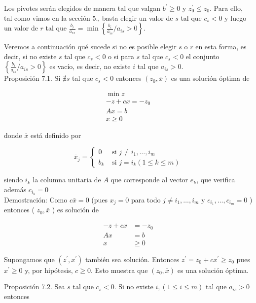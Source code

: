 \documentclass[10pt]{article}
\begin{document}
Los pivotes serán elegidos de manera tal que valgan $b^{\prime} \geq 0$ y $z_{0}^{\prime} \leq z_{0}$. Para ello, tal como vimos en la sección 5., basta elegir un valor de $s$ tal que $c_{s}<0$ y luego un valor de $r$ tal que $\frac{b_{r}}{a_{r s}}=\min \left\{\frac{b_{i}}{a_{i s}} / a_{i s}>0\right\}$.

Veremos a continuación qué sucede si no es posible elegir $s$ o $r$ en esta forma, es decir, si no existe $s$ tal que $c_{s}<0$ o si para $s$ tal que $c_{s}<0$ el conjunto $\left\{\frac{b_{i}}{a_{i s}} / a_{i s}>0\right\}$ es vacío, es decir, no existe $i$ tal que $a_{i s}>0$.\\
Proposición 7.1. Si $\nexists s$ tal que $c_{s}<0$ entonces $\left(z_{0}, \bar{x}\right)$ es una solución óptima de

$$
\begin{gathered}
\min z \\
-z+c x=-z_{0} \\
A x=b \\
x \geq 0
\end{gathered}
$$

donde $\bar{x}$ está definido por

$$
\bar{x}_{j}= \begin{cases}0 & \text { si } j \neq i_{1}, \ldots, i_{m} \\ b_{k} & \text { si } j=i_{k}(1 \leq k \leq m)\end{cases}
$$

siendo $i_{k}$ la columna unitaria de $A$ que corresponde al vector $e_{k}$, que verifica además $c_{i_{k}}=0$\\
Demostración: Como $c \bar{x}=0$ (pues $x_{j}=0$ para todo $j \neq i_{1}, \ldots, i_{m}$ y $c_{i_{1}}, \ldots, c_{i_{m}}=0$ ) entonces ( $z_{0}, \bar{x}$ ) es solución de

$$
\begin{aligned}
-z+c x & =-z_{0} \\
A x & =b \\
x & \geq 0
\end{aligned}
$$

Supongamos que $\left(z^{\prime}, x^{\prime}\right)$ también sea solución. Entonces $z^{\prime}=z_{0}+c x^{\prime} \geq z_{0}$ pues $x^{\prime} \geq 0$ y, por hipótesis, $c \geq 0$. Esto muestra que $\left(z_{0}, \bar{x}\right)$ es una solución óptima.

Proposición 7.2. Sea $s$ tal que $c_{s}<0$. Si no existe $i,(1 \leq i \leq m)$ tal que $a_{i s}>0$ entonces
\end{document}
